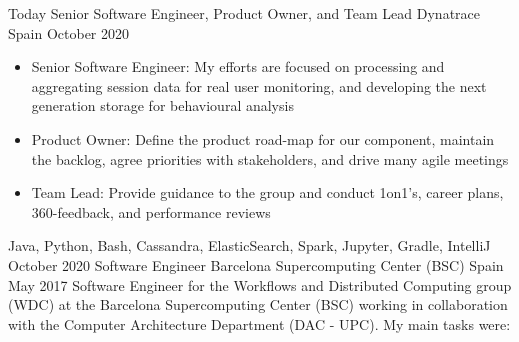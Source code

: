 %
%
%


\begin{experiences}
    \experience
        {Today}
        {Senior Software Engineer, Product Owner, and Team Lead}
        {Dynatrace}
        {Spain}
        {October 2020}
        {
        \begin{itemize}
            \item Senior Software Engineer: My efforts are focused on processing and aggregating session data for real user monitoring, and developing the next generation storage for behavioural analysis
            \item Product Owner: Define the product road-map for our component, maintain the backlog, agree priorities with stakeholders, and drive many agile meetings
            \item Team Lead: Provide guidance to the group and conduct 1on1's, career plans, 360-feedback, and performance reviews
        \end{itemize}
        }
        {Java, Python, Bash, Cassandra, ElasticSearch, Spark, Jupyter, Gradle, IntelliJ}
    \emptySeparator
    \experience
        {October 2020}
        {Software Engineer}
        {Barcelona Supercomputing Center (BSC)}
        {Spain}
        {May 2017}
        {Software Engineer for the Workflows and Distributed Computing group (WDC) at the Barcelona Supercomputing Center (BSC) working in collaboration with the Computer Architecture Department (DAC - UPC). My main tasks were:
}
\end{experiences}

